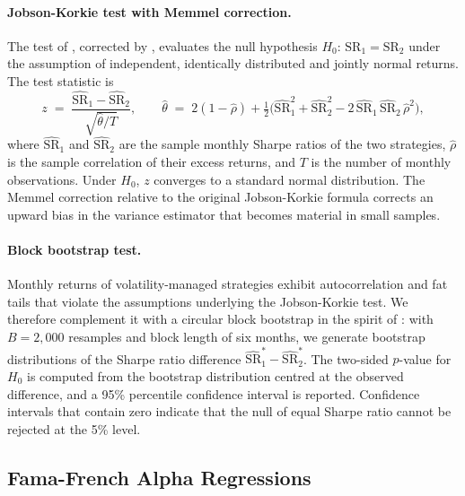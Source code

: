 \documentclass[12pt, a4paper]{article}
\begin{document}
\paragraph{Jobson-Korkie test with Memmel correction.}
The test of \citet{JobsonKorkie1981}, corrected by \citet{Memmel2003}, evaluates the null
hypothesis $H_0$: $\mathrm{SR}_1 = \mathrm{SR}_2$ under the assumption of independent,
identically distributed and jointly normal returns. The test statistic is
\begin{equation}
  z \;=\;
  \frac{\widehat{\mathrm{SR}}_1 - \widehat{\mathrm{SR}}_2}
       {\sqrt{\hat\theta / T}},
  \qquad
  \hat\theta \;=\;
  2(1 - \hat\rho)
  + \tfrac{1}{2}\bigl(\widehat{\mathrm{SR}}_1^2 + \widehat{\mathrm{SR}}_2^2
                       - 2\,\widehat{\mathrm{SR}}_1\,\widehat{\mathrm{SR}}_2\,\hat\rho^2\bigr),
\end{equation}
where $\widehat{\mathrm{SR}}_1$ and $\widehat{\mathrm{SR}}_2$ are the sample monthly
Sharpe ratios of the two strategies, $\hat\rho$ is the sample correlation of their excess
returns, and $T$ is the number of monthly observations. Under $H_0$, $z$ converges to a
standard normal distribution. The Memmel correction relative to the original
Jobson-Korkie formula corrects an upward bias in the variance estimator that becomes
material in small samples.

\paragraph{Block bootstrap test.}
Monthly returns of volatility-managed strategies exhibit autocorrelation and fat tails
that violate the assumptions underlying the Jobson-Korkie test. We therefore complement
it with a circular block bootstrap in the spirit of \citet{LedoitWolf2008}: with
$B = 2{,}000$ resamples and block length of six months, we generate bootstrap
distributions of the Sharpe ratio difference $\widehat{\mathrm{SR}}_1^* - \widehat{\mathrm{SR}}_2^*$.
The two-sided $p$-value for $H_0$ is computed from the bootstrap distribution centred at
the observed difference, and a 95\% percentile confidence interval is reported. Confidence
intervals that contain zero indicate that the null of equal Sharpe ratio cannot be
rejected at the 5\% level.

\subsection{Fama-French Alpha Regressions}
\label{sec:meth_ff}
\end{document}
